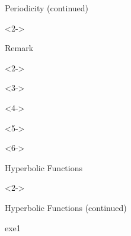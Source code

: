 \def\EMtitlesize{26}\def\EMtitleskip{31}
\begin{frame}{Periodicity (continued)}
\begin{minipage}[t]{500bp}\vspace{0pt}
\begin{uncoverenv}<2->
\end{uncoverenv}
\EMgap
\end{minipage}
\end{frame}

\def\EMtitlesize{26}\def\EMtitleskip{31}
\begin{frame}{Remark}
\begin{uncoverenv}<2->
\end{uncoverenv}
\EMgap
\begin{uncoverenv}<3->
\end{uncoverenv}
\EMgap
\begin{uncoverenv}<4->
\end{uncoverenv}
\EMgap
\begin{uncoverenv}<5->
\vspace{3bp}
\end{uncoverenv}
\EMgap
\begin{uncoverenv}<6->
\end{uncoverenv}
\end{frame}

\def\EMtitlesize{26}\def\EMtitleskip{31}
\begin{frame}{Hyperbolic Functions}
\begin{uncoverenv}<2->
\end{uncoverenv}
\end{frame}

\def\EMtitlesize{26}\def\EMtitleskip{31}
\begin{frame}{Hyperbolic Functions (continued)}
\begin{EMbox}{exe}{1}{}
\vspace{3bp}
\end{EMbox}
\end{frame}


